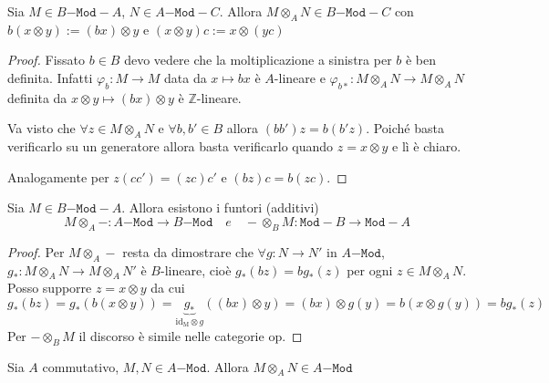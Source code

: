 \begin{proposition}{}
    Sia \(M \in B\mathtt{-Mod-}A\), \(N \in A\mathtt{-Mod-}C\). Allora \(M
    \otimes_A N \in B\mathtt{-Mod-}C\) con \(b{(x \otimes y)} := {(bx)} \otimes
    y\) e \({(x \otimes y)}c := x \otimes {(yc)}\) 
\end{proposition}
\begin{proof}{}
    Fissato \(b \in B\) devo vedere che la moltiplicazione a sinistra per \(b\)
    è ben definita. Infatti \(\varphi_b : M \to M\) data da \(x \mapsto bx\) è
    \(A\)-lineare e \(\varphi_{b*} : M \otimes_A N \to M \otimes_A N\) definita
    da \(x \otimes y \mapsto {(bx)} \otimes y\) è \(\mathbb{Z}\)-lineare.

    Va visto che \(\forall z \in M \otimes_A N\) e \(\forall b, b' \in B\)
    allora \({(b b')}z = b{(b' z)}\). Poiché basta verificarlo su un generatore
    allora basta verificarlo quando \(z = x \otimes y\) e lì è chiaro.

    Analogamente per \(z {(c c')} = {(z c)}c'\) e \({(bz)}c = b{(zc)}\).
\end{proof}

\begin{corollary}{}
    Sia \(M \in B\mathtt{-Mod-}A\). Allora esistono i funtori (additivi)
    \[
      M \otimes_A - : A\mathtt{-Mod} \to B\mathtt{-Mod} \quad e \quad -
      \otimes_B M : \mathtt{Mod-}B \to \mathtt{Mod}-A
    \]
\end{corollary}
\begin{proof}{}
    Per \(M \otimes_A -\) resta da dimostrare che \(\forall g : N \to N'\) in
    \(A\mathtt{-Mod}\), \(g_* : M \otimes_A N \to M \otimes_A N'\) è
    \(B\)-lineare, cioè \(g_*{(bz)} = bg_*{(z)}\) per ogni \(z \in M \otimes_A
    N\). Posso supporre \(z= x \otimes y\) da cui
    \[
        g_* {(bz)} = g_* {(b {(x \otimes y)})} =
        \underbrace{g_*}_{\mathrm{id_M} \otimes g} {({(bx)} \otimes y)} = {(bx)}
      \otimes g{(y)} = b{(x \otimes g{(y)})} = b g_* {(z)}
    \]
    Per \(- \otimes_B M\) il discorso è simile nelle categorie op.
\end{proof}

\begin{corollary}{}
    Sia \(A\) commutativo, \(M, N \in A\mathtt{-Mod}\). Allora \(M \otimes_A N
    \in A\mathtt{-Mod}\) 
\end{corollary}


